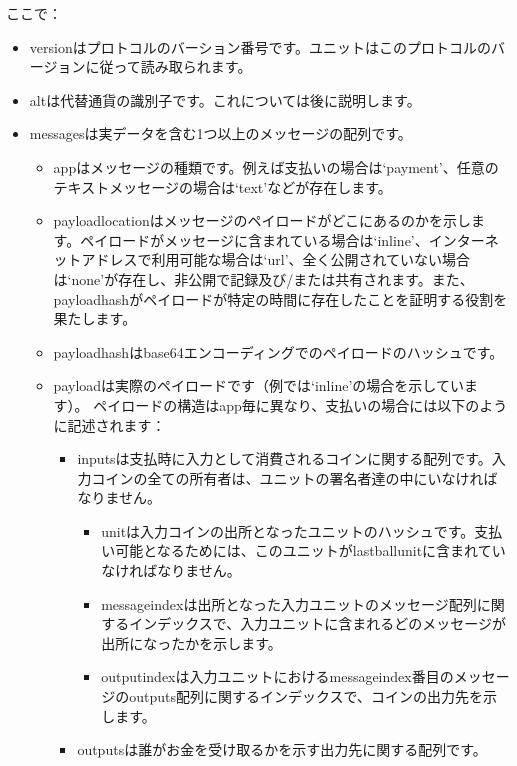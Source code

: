 \documentclass[a4paper, dvipdfmx]{jsarticle}
\begin{document}
\noindent ここで：
\begin{itemize}
    \item versionはプロトコルのバーション番号です。ユニットはこのプロトコルのバージョンに従って読み取られます。
    \item altは代替通貨の識別子です。これについては後に説明します。
    \item messagesは実データを含む1つ以上のメッセージの配列です。
    \begin{itemize}
        \item appはメッセージの種類です。例えば支払いの場合は`payment'、任意のテキストメッセージの場合は`text'などが存在します。
        \item  payload\textunderscore locationはメッセージのペイロードがどこにあるのかを示します。ペイロードがメッセージに含まれている場合は`inline'、インターネットアドレスで利用可能な場合は`url'、全く公開されていない場合は`none'が存在し、非公開で記録及び/または共有されます。また、payload\textunderscore hashがペイロードが特定の時間に存在したことを証明する役割を果たします。
        \item payload\textunderscore hashはbase64エンコーディングでのペイロードのハッシュです。
        \item payloadは実際のペイロードです（例では`inline'の場合を示しています）。 ペイロードの構造はapp毎に異なり、支払いの場合には以下のように記述されます：
        \begin{itemize}
            \item  inputsは支払時に入力として消費されるコインに関する配列です。入力コインの全ての所有者は、ユニットの署名者達の中にいなければなりません。
            \begin{itemize}
                \item unitは入力コインの出所となったユニットのハッシュです。支払い可能となるためには、このユニットがlast\textunderscore ball\textunderscore unitに含まれていなければなりません。
                \item message\textunderscore indexは出所となった入力ユニットのメッセージ配列に関するインデックスで、入力ユニットに含まれるどのメッセージが出所になったかを示します。
                \item output\textunderscore indexは入力ユニットにおけるmessage\textunderscore index番目のメッセージのoutputs配列に関するインデックスで、コインの出力先を示します。
            \end{itemize}
            \item outputsは誰がお金を受け取るかを示す出力先に関する配列です。

\end{itemize}
\end{itemize}
\end{itemize}
\end{document}
